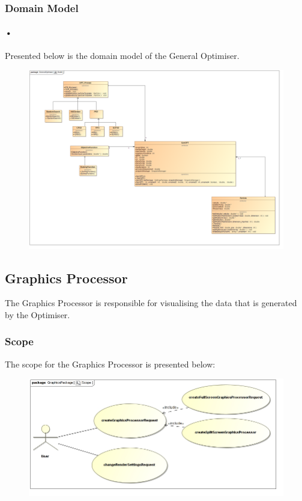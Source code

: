 \documentclass[11pt]{article}
\begin{document}
\subsubsection{Domain Model}
\paragraph{•}
Presented below is the domain model of the General Optimiser.
\begin{figure}[H]
\includegraphics[scale=0.2]{OPTModel.png}
\end{figure}

\subsection{Graphics Processor}
The Graphics Processor is responsible for visualising the data that is generated by the Optimiser. 

\subsubsection{Scope}
The scope for the Graphics Processor is presented below:
\begin{figure}[H]
\includegraphics[scale=0.45]{GraphicsProcessor/Scope.jpg}
\end{figure} 
\end{document}
